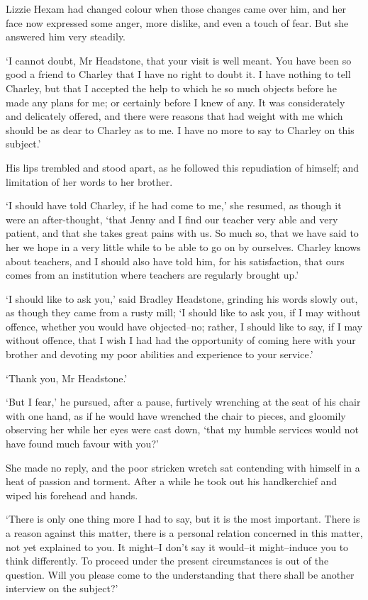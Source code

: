 Lizzie Hexam had changed colour when those changes came over him, and
her face now expressed some anger, more dislike, and even a touch of
fear. But she answered him very steadily.

‘I cannot doubt, Mr Headstone, that your visit is well meant. You have
been so good a friend to Charley that I have no right to doubt it. I
have nothing to tell Charley, but that I accepted the help to which he
so much objects before he made any plans for me; or certainly before I
knew of any. It was considerately and delicately offered, and there were
reasons that had weight with me which should be as dear to Charley as to
me. I have no more to say to Charley on this subject.’

His lips trembled and stood apart, as he followed this repudiation of
himself; and limitation of her words to her brother.

‘I should have told Charley, if he had come to me,’ she resumed, as
though it were an after-thought, ‘that Jenny and I find our teacher very
able and very patient, and that she takes great pains with us. So much
so, that we have said to her we hope in a very little while to be able
to go on by ourselves. Charley knows about teachers, and I should also
have told him, for his satisfaction, that ours comes from an institution
where teachers are regularly brought up.’

‘I should like to ask you,’ said Bradley Headstone, grinding his words
slowly out, as though they came from a rusty mill; ‘I should like to
ask you, if I may without offence, whether you would have objected--no;
rather, I should like to say, if I may without offence, that I wish I
had had the opportunity of coming here with your brother and devoting my
poor abilities and experience to your service.’

‘Thank you, Mr Headstone.’

‘But I fear,’ he pursued, after a pause, furtively wrenching at the seat
of his chair with one hand, as if he would have wrenched the chair to
pieces, and gloomily observing her while her eyes were cast down, ‘that
my humble services would not have found much favour with you?’

She made no reply, and the poor stricken wretch sat contending with
himself in a heat of passion and torment. After a while he took out his
handkerchief and wiped his forehead and hands.

‘There is only one thing more I had to say, but it is the most
important. There is a reason against this matter, there is a personal
relation concerned in this matter, not yet explained to you. It might--I
don’t say it would--it might--induce you to think differently. To
proceed under the present circumstances is out of the question. Will you
please come to the understanding that there shall be another interview
on the subject?’

